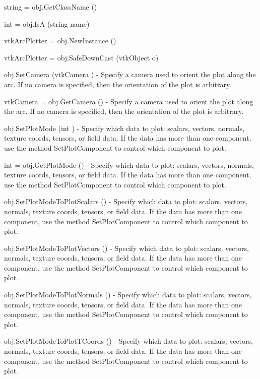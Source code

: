 \begin{DoxyItemize}
\item {\ttfamily string = obj.\-Get\-Class\-Name ()}  
\item {\ttfamily int = obj.\-Is\-A (string name)}  
\item {\ttfamily vtk\-Arc\-Plotter = obj.\-New\-Instance ()}  
\item {\ttfamily vtk\-Arc\-Plotter = obj.\-Safe\-Down\-Cast (vtk\-Object o)}  
\item {\ttfamily obj.\-Set\-Camera (vtk\-Camera )} -\/ Specify a camera used to orient the plot along the arc. If no camera is specified, then the orientation of the plot is arbitrary.  
\item {\ttfamily vtk\-Camera = obj.\-Get\-Camera ()} -\/ Specify a camera used to orient the plot along the arc. If no camera is specified, then the orientation of the plot is arbitrary.  
\item {\ttfamily obj.\-Set\-Plot\-Mode (int )} -\/ Specify which data to plot\-: scalars, vectors, normals, texture coords, tensors, or field data. If the data has more than one component, use the method Set\-Plot\-Component to control which component to plot.  
\item {\ttfamily int = obj.\-Get\-Plot\-Mode ()} -\/ Specify which data to plot\-: scalars, vectors, normals, texture coords, tensors, or field data. If the data has more than one component, use the method Set\-Plot\-Component to control which component to plot.  
\item {\ttfamily obj.\-Set\-Plot\-Mode\-To\-Plot\-Scalars ()} -\/ Specify which data to plot\-: scalars, vectors, normals, texture coords, tensors, or field data. If the data has more than one component, use the method Set\-Plot\-Component to control which component to plot.  
\item {\ttfamily obj.\-Set\-Plot\-Mode\-To\-Plot\-Vectors ()} -\/ Specify which data to plot\-: scalars, vectors, normals, texture coords, tensors, or field data. If the data has more than one component, use the method Set\-Plot\-Component to control which component to plot.  
\item {\ttfamily obj.\-Set\-Plot\-Mode\-To\-Plot\-Normals ()} -\/ Specify which data to plot\-: scalars, vectors, normals, texture coords, tensors, or field data. If the data has more than one component, use the method Set\-Plot\-Component to control which component to plot.  
\item {\ttfamily obj.\-Set\-Plot\-Mode\-To\-Plot\-T\-Coords ()} -\/ Specify which data to plot\-: scalars, vectors, normals, texture coords, tensors, or field data. If the data has more than one component, use the method Set\-Plot\-Component to control which component to plot.  

\end{DoxyItemize}
